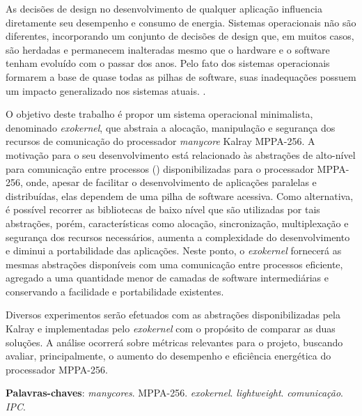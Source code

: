 \documentclass[
	12pt,				%
	openright,			%
	twoside,			%
	a4paper,			%
	english,			%
	brazil,				%
	]{abntex2}
\begin{document}
\begin{resumo}

    As decisões de design no desenvolvimento de qualquer aplicação influencia diretamente seu desempenho e consumo de energia.
    Sistemas operacionais não são diferentes, incorporando um conjunto de decisões de design que, em muitos casos, são herdadas e permanecem inalteradas mesmo que o hardware e o software tenham evoluído com o passar dos anos.
    Pelo fato dos sistemas operacionais formarem a base de quase todas as pilhas de software, suas inadequações possuem um impacto generalizado nos sistemas atuais. \cite{hunt_singularity:_2007}. 
    
    O objetivo deste trabalho é propor um sistema operacional minimalista, denominado \textit{exokernel}, que abstraia a alocação, manipulação e segurança dos recursos de comunicação do processador \textit{manycore} Kalray MPPA-256.
    A motivação para o seu desenvolvimento está relacionado às abstrações de alto-nível para comunicação entre processos (\ipc) disponibilizadas para o processador MPPA-256, onde, apesar de facilitar o desenvolvimento de aplicações paralelas e distribuídas, elas dependem de uma pilha de software acessiva.
    Como alternativa, é possível recorrer as bibliotecas de baixo nível que são utilizadas por tais abstrações, porém, características como alocação, sincronização, multiplexação e segurança dos recursos necessários, aumenta a complexidade do desenvolvimento e diminui a portabilidade das aplicações.
    Neste ponto, o \textit{exokernel} fornecerá as mesmas abstrações \ipc disponíveis com uma comunicação entre processos eficiente, agregado a uma quantidade menor de camadas de software intermediárias e conservando a facilidade e portabilidade existentes.
    
    Diversos experimentos serão efetuados com as abstrações disponibilizadas pela Kalray e implementadas pelo \textit{exokernel} com o propósito de comparar as duas soluções.
    A análise ocorrerá sobre métricas relevantes para o projeto, buscando avaliar, principalmente, o aumento do desempenho e eficiência energética do processador MPPA-256.

 \vspace{\onelineskip}
    
 \noindent
 \textbf{Palavras-chaves}: \textit{manycores}. MPPA-256. \textit{exokernel}. \textit{lightweight}. \textit{comunicação}. \textit{IPC}.
\end{resumo}

\end{document}
